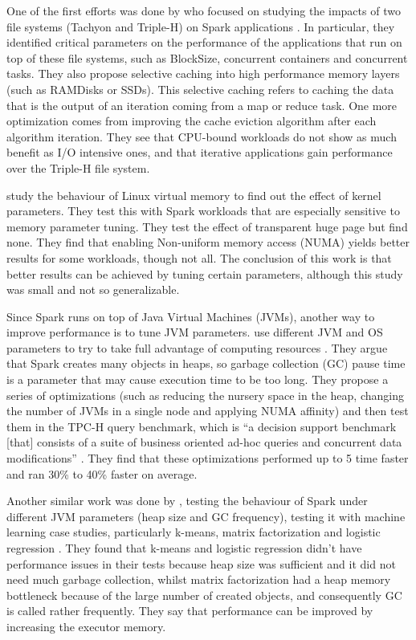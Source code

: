 \documentclass{article}
\begin{document}
One of the first efforts was done by \citeauthor{Islam2015} who focused on studying the impacts of two file systems (Tachyon and Triple-H) on Spark applications \cite{Islam2015}. In particular, they identified critical parameters on the performance of the applications that run on top of these file systems, such as BlockSize, concurrent containers and concurrent tasks. They also propose selective caching into high performance memory layers (such as RAMDisks or SSDs). This selective caching refers to caching the data that is the output of an iteration coming from a map or reduce task. One more optimization comes from improving the cache eviction algorithm after each algorithm iteration. They see that CPU-bound workloads do not show as much benefit as I/O intensive ones, and that iterative applications gain performance over the Triple-H file system.

\citeauthor{Wang2016} \cite{Wang2016} study the behaviour of Linux virtual memory to find out the effect of kernel parameters. They test this with Spark workloads that are especially sensitive to memory parameter tuning. They test the effect of transparent huge page but find none. They find that enabling Non-uniform memory access (NUMA) yields better results for some workloads, though not all. The conclusion of this work is that better results can be achieved by tuning certain parameters, although this study was small and not so generalizable.

Since Spark runs on top of Java Virtual Machines (JVMs), another way to improve performance is to tune JVM parameters. \citeauthor{Chiba2016} use different JVM and OS parameters to try to take full advantage of computing resources \cite{Chiba2016}. They argue that Spark creates many objects in heaps, so garbage collection (GC) pause time is a parameter that may cause execution time to be too long. They propose a series of optimizations (such as reducing the nursery space in the heap, changing the number of JVMs in a single node and applying NUMA affinity) and then test them in the TPC-H query benchmark,  which is ``a decision support benchmark [that] consists of a suite of business oriented ad-hoc queries and concurrent data modifications'' \cite{TPC_H_benchmark}. They find that these optimizations performed up to 5 time faster and ran 30\% to 40\% faster on average.

Another similar work was done by \citeauthor{Hema2016}, testing the behaviour of Spark under different JVM parameters (heap size and GC frequency), testing it with machine learning case studies, particularly k-means, matrix factorization and logistic regression \cite{Hema2016}. They found that k-means and logistic regression didn't have performance issues in their tests because heap size was sufficient and it did not need much garbage collection, whilst matrix factorization had a heap memory bottleneck because of the large number of created objects, and consequently GC is called rather frequently. They say that performance can be improved by increasing the executor memory.
\end{document}

